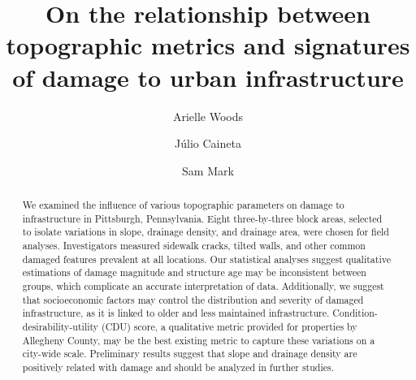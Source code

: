 \documentclass[final,12pt,times,twocolumn,authoryear]{elsarticle}
\begin{document}
\begin{frontmatter}



\title{On the relationship between topographic metrics and signatures of damage to urban infrastructure}


\author[geol]{Arielle Woods}
\author[cmsp,geol]{Júlio Caineta}
\author[geol]{Sam Mark}

\address[geol]{Department of Geology and Environmental Science, University of Pittsburgh, Pittsburgh PA, 15260, USA}
\address[cmsp]{Computational Modeling and Simulation, University of Pittsburgh, Pittsburgh PA 15260, USA}

\begin{abstract}
We examined the influence of various topographic parameters on damage to infrastructure in Pittsburgh, Pennsylvania. Eight three-by-three block areas, selected to isolate variations in slope, drainage density, and drainage area, were chosen for field analyses. Investigators measured sidewalk cracks, tilted walls, and other common damaged features prevalent at all locations. Our statistical analyses suggest qualitative estimations of damage magnitude and structure age may be inconsistent between groups, which complicate an accurate interpretation of data. Additionally, we suggest that socioeconomic factors may control the distribution and severity of damaged infrastructure, as it is linked to older and less maintained infrastructure. Condition-desirability-utility (CDU) score, a qualitative metric provided for properties by Allegheny County, may be the best existing metric to capture these variations on a city-wide scale. Preliminary results suggest that slope and drainage density are positively related with damage and should be analyzed in further studies.


\end{abstract}
\end{frontmatter}
\end{document}
